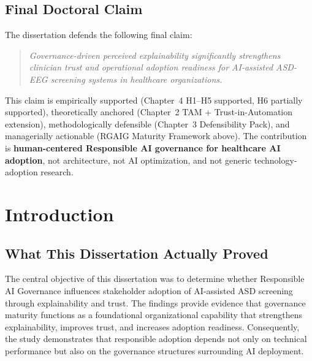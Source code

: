\subsection*{Final Doctoral Claim}
\label{sec:ch5_final_claim}

\noindent The dissertation defends the following final claim:

\begin{quote}
\emph{Governance-driven perceived explainability significantly strengthens clinician trust and operational adoption readiness for AI-assisted ASD-EEG screening systems in healthcare organizations.}
\end{quote}

\noindent This claim is empirically supported (Chapter~4 H1--H5 supported, H6 partially supported), theoretically anchored (Chapter~2 TAM + Trust-in-Automation extension), methodologically defensible (Chapter~3 Defensibility Pack), and managerially actionable (RGAIG Maturity Framework above). The contribution is \textbf{human-centered Responsible AI governance for healthcare AI adoption}, not architecture, not AI optimization, and not generic technology-adoption research.

\section{Introduction}


\subsection{What This Dissertation Actually Proved}
\label{sec:what_actually_proved}

\noindent The central objective of this dissertation was to determine whether Responsible AI Governance influences stakeholder adoption of AI-assisted ASD screening through explainability and trust. The findings provide evidence that governance maturity functions as a foundational organizational capability that strengthens explainability, improves trust, and increases adoption readiness. Consequently, the study demonstrates that responsible adoption depends not only on technical performance but also on the governance structures surrounding AI deployment.

